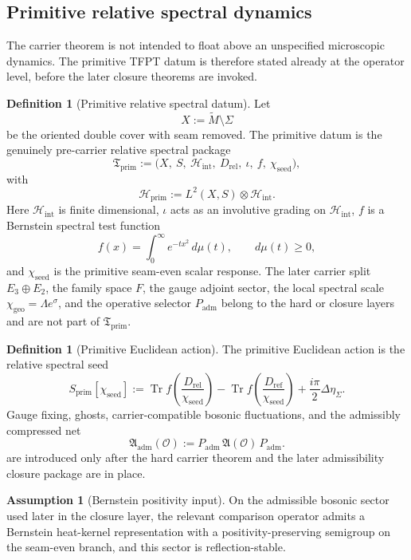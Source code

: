 \documentclass[11pt,a4paper]{article}
\theoremstyle{definition}
\newtheorem{definition}[theorem]{Definition}
\newtheorem{assumption}[theorem]{Assumption}
\theoremstyle{remark}
\DeclareMathOperator{\tr}{Tr}
\newcommand{\Seam}{\Sigma}
\newcommand{\inv}{\iota}
\newcommand{\Hint}{\mathcal H_{\mathrm{int}}}
\newcommand{\Tprim}{\mathfrak T_{\mathrm{prim}}}
\newcommand{\chiseed}{\chi_{\mathrm{seed}}}
\newcommand{\chigeo}{\chi_{\mathrm{geo}}}
\newcommand{\Padm}{P_{\mathrm{adm}}}
\begin{document}
\subsection{Primitive relative spectral dynamics}

The carrier theorem is not intended to float above an unspecified microscopic dynamics. The primitive TFPT datum is therefore stated already at the operator level, before the later closure theorems are invoked.

\begin{definition}[Primitive relative spectral datum]
Let
\[
X:=\widetilde M\setminus \Seam
\]
be the oriented double cover with seam removed. The primitive datum is the genuinely pre-carrier relative spectral package
\[
\Tprim
:=
\bigl(
X,\ S,\ \Hint,\ D_{\mathrm{rel}},\ \inv,\ f,\ \chiseed
\bigr),
\]
with
\[
\mathcal H_{\mathrm{prim}}
:=
L^2(X,S)\otimes \Hint.
\]
Here $\Hint$ is finite dimensional, $\inv$ acts as an involutive grading on $\Hint$, $f$ is a Bernstein spectral test function
\begin{equation}
\label{eq:bernstein-test-function}
f(x)=\int_0^\infty e^{-t x^2}\,d\mu(t),
\qquad
d\mu(t)\ge 0,
\end{equation}
and $\chiseed$ is the primitive seam-even scalar response. The later carrier split $E_3\oplus E_2$, the family space $F$, the gauge adjoint sector, the local spectral scale $\chigeo=\Lambda e^\sigma$, and the operative selector $\Padm$ belong to the hard or closure layers and are not part of $\Tprim$.
\end{definition}

\begin{definition}[Primitive Euclidean action]
The primitive Euclidean action is the relative spectral seed
\[
S_{\mathrm{prim}}[\chiseed]
:=
\tr f\!\left(\frac{D_{\mathrm{rel}}}{\chiseed}\right)
-
\tr f\!\left(\frac{D_{\mathrm{ref}}}{\chiseed}\right)
+\frac{i\pi}{2}\Delta\eta_\Sigma.
\]
Gauge fixing, ghosts, carrier-compatible bosonic fluctuations, and the admissibly compressed net
\[
\mathfrak A_{\mathrm{adm}}(\mathcal O):=
\Padm\,\mathfrak A(\mathcal O)\,\Padm.
\]
are introduced only after the hard carrier theorem and the later admissibility closure package are in place.
\end{definition}

\begin{assumption}[Bernstein positivity input]
\label{ass:bernstein-positivity}
On the admissible bosonic sector used later in the closure layer, the relevant comparison operator admits a Bernstein heat-kernel representation with a positivity-preserving semigroup on the seam-even branch, and this sector is reflection-stable.
\end{assumption}
\end{document}
